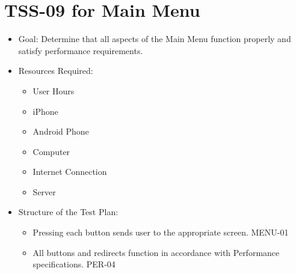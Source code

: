\section{TSS-09 for Main Menu}
\begin{itemize}
\item Goal: Determine that all aspects of the Main Menu function properly and satisfy
performance requirements.
\item Resources Required: 

\begin{itemize}
\item User Hours 
\item iPhone 
\item Android Phone 
\item Computer 
\item Internet Connection 
\item Server
\end{itemize}
\item Structure of the Test Plan: 

\begin{itemize}

\item Pressing each button sends user to the appropriate screen. MENU-01
\item All buttons and redirects function in accordance with Performance specifications. PER-04

\end{itemize}
\end{itemize}

